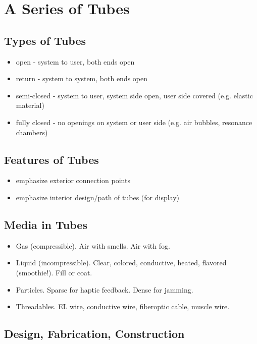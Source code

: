 \section{A Series of Tubes}

\subsection{Types of Tubes}

\begin{itemize}
\item open - system to user, both ends open
\item return - system to system, both ends open
\item semi-closed - system to user, system side open, user side covered (e.g. elastic material)
\item fully closed - no openings on system or user side (e.g. air bubbles, resonance chambers)
\end{itemize}

\subsection{Features of Tubes}

\begin{itemize}
\item emphasize exterior connection points
\item emphasize interior design/path of tubes (for display)
\end{itemize}

\subsection{Media in Tubes}

\begin{itemize}
\item Gas (compressible).  Air with smells.  Air with fog.
\item Liquid (incompressible).  Clear, colored, conductive, heated, flavored (smoothie!).  Fill or coat.
\item Particles.  Sparse for haptic feedback.  Dense for jamming.
\item Threadables.  EL wire, conductive wire, fiberoptic cable, muscle wire.
\end{itemize}

\subsection{Design, Fabrication, Construction}


